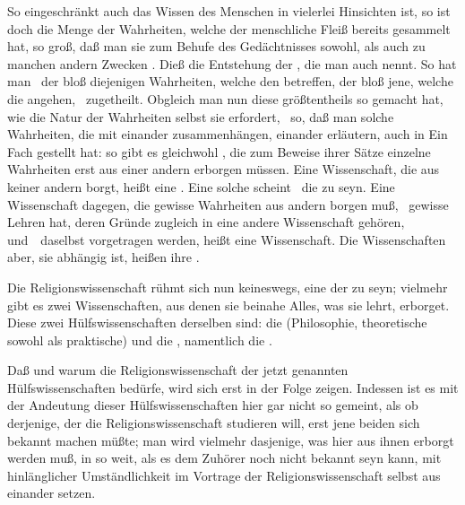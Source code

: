 So eingeschränkt auch das Wissen des Menschen in vielerlei Hinsichten ist, so ist doch die Menge der Wahrheiten, welche der menschliche Fleiß bereits gesammelt hat, so groß, daß man sie zum Behufe des Gedächtnisses sowohl, als auch zu manchen andern Zwecken . Dieß die Entstehung der , die man auch  nennt. So hat man \zB\ der  bloß diejenigen Wahrheiten, welche den  betreffen, der  bloß jene, welche die  angehen, \usw\ zugetheilt. Obgleich man nun diese  größtentheils so gemacht hat, wie die Natur der Wahrheiten selbst sie erfordert, \dh\ so, daß man solche Wahrheiten, die mit einander zusammenhängen, einander erläutern, auch in Ein Fach gestellt hat: so gibt es gleichwohl , die zum Beweise ihrer Sätze einzelne Wahrheiten erst aus einer andern erborgen müssen. Eine Wissenschaft, die aus keiner andern borgt, heißt eine . Eine solche scheint \zB\ die  zu seyn. Eine Wissenschaft dagegen, die gewisse Wahrheiten aus andern borgen muß, \dh\ gewisse Lehren hat, deren Gründe zugleich in eine andere Wissenschaft gehören, und~\ daselbst vorgetragen werden, heißt eine  Wissenschaft. Die Wissenschaften aber,  sie abhängig ist, heißen ihre .\par
Die Religionswissenschaft rühmt sich nun keineswegs, eine der  zu seyn; vielmehr gibt es zwei Wissenschaften, aus denen sie beinahe Alles, was sie lehrt, erborget. Diese zwei Hülfswissenschaften derselben sind: die  (Philosophie, theoretische sowohl als praktische) und die , namentlich die .\par
Daß und warum die Religionswissenschaft der jetzt genannten Hülfswissenschaften bedürfe, wird sich erst in der Folge zeigen. Indessen ist es mit der Andeutung dieser Hülfswissenschaften hier gar nicht so gemeint, als ob derjenige, der die Religionswissenschaft studieren will, erst jene beiden sich bekannt machen müßte; man wird vielmehr dasjenige, was hier aus ihnen erborgt werden muß, in so weit, als es dem Zuhörer noch nicht bekannt seyn kann, mit hinlänglicher Umständlichkeit im Vortrage der Religionswissenschaft selbst aus einander setzen.


